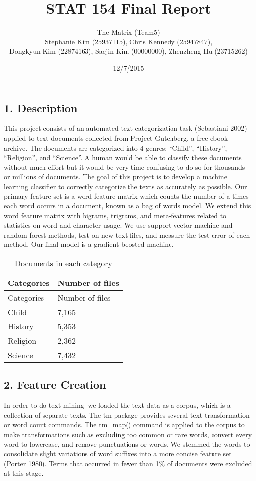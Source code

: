 \documentclass[12pt,]{article}
\title{STAT 154 Final Report}
\author{The Matrix (Team5)\\Stephanie Kim (25937115), Chris Kennedy
(25947847),\\Dongkyun Kim (22874163), Saejin Kim (00000000), Zhenzheng
Hu (23715262)}
\date{12/7/2015}
\begin{document}
\maketitle


{
\hypersetup{linkcolor=black}
\setcounter{tocdepth}{2}
\tableofcontents
}
\subsection{1. Description}\label{description}

This project consists of an automated text categorization task
(Sebastiani 2002) applied to text documents collected from Project
Gutenberg, a free ebook archive. The documents are categorized into 4
genres: ``Child'', ``History'', ``Religion'', and ``Science''. A human
would be able to classify these documents without much effort but it
would be very time confusing to do so for thousands or millions of
documents. The goal of this project is to develop a machine learning
classifier to correctly categorize the texts as accurately as possible.
Our primary feature set is a word-feature matrix which counts the number
of a times each word occurs in a document, known as a bag of words
model. We extend this word feature matrix with bigrams, trigrams, and
meta-features related to statistics on word and character usage. We use
support vector machine and random forest methods, test on new text
files, and measure the test error of each method. Our final model is a
gradient boosted machine.

\begin{longtable}[c]{@{}ll@{}}
\caption{Documents in each category}\tabularnewline
\toprule
Categories & Number of files\tabularnewline
\midrule
\endfirsthead
\toprule
Categories & Number of files\tabularnewline
\midrule
\endhead
Child & 7,165\tabularnewline
History & 5,353\tabularnewline
Religion & 2,362\tabularnewline
Science & 7,432\tabularnewline
\bottomrule
\end{longtable}

\subsection{2. Feature Creation}\label{feature-creation}

In order to do text mining, we loaded the text data as a corpus, which
is a collection of separate texts. The tm package provides several text
transformation or word count commands. The tm\_map() command is applied
to the corpus to make transformations such as excluding too common or
rare words, convert every word to lowercase, and remove punctuations or
words. We stemmed the words to consolidate slight variations of word
suffixes into a more concise feature set (Porter 1980). Terms that
occurred in fewer than 1\% of documents were excluded at this stage.
\end{document}
